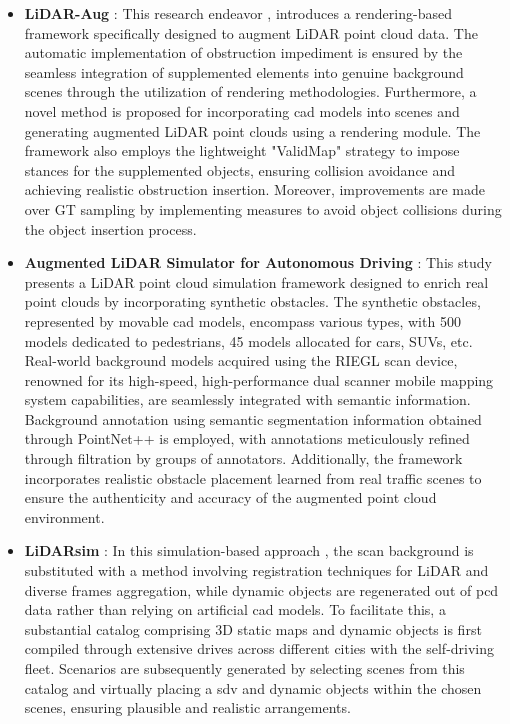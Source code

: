 \begin{itemize}
    \item \textbf{LiDAR-Aug} : This research endeavor \parencite{lidar_aug}, introduces a rendering-based framework specifically designed to augment LiDAR point cloud data. The automatic implementation of obstruction impediment is ensured by the seamless integration of supplemented elements into genuine background scenes through the utilization of rendering methodologies. Furthermore, a novel method is proposed for incorporating \acrfull{cad} models into scenes and generating augmented LiDAR point clouds using a rendering module. The framework also employs the lightweight "ValidMap" strategy to impose stances for the supplemented objects, ensuring collision avoidance and achieving realistic obstruction insertion. Moreover, improvements are made over GT sampling by implementing measures to avoid object collisions during the object insertion process.
    \item \textbf{Augmented LiDAR Simulator for Autonomous Driving} : This study \parencite{aug_lidar_sim_2020} presents a LiDAR point cloud simulation framework  designed to enrich real point clouds by incorporating synthetic obstacles. The synthetic obstacles, represented by movable \acrshort{cad} models, encompass various types, with 500 models dedicated to pedestrians, 45 models allocated for cars, SUVs, etc. Real-world background models acquired using the RIEGL scan device, renowned for its high-speed, high-performance dual scanner mobile mapping system capabilities, are seamlessly integrated with semantic information. Background annotation using semantic segmentation information obtained through PointNet++ \parencite{pointnetplus2017} is employed, with annotations meticulously refined through filtration by groups of annotators. Additionally, the framework incorporates realistic obstacle placement learned from real traffic scenes to ensure the authenticity and accuracy of the augmented point cloud environment.
    \item \textbf{LiDARsim} : In this simulation-based approach \parencite{lidarsim2020}, the scan background is substituted with a method involving registration techniques for LiDAR and diverse frames aggregation, while dynamic objects are regenerated out of \acrshort{pcd} data rather than relying on artificial \acrshort{cad} models. To facilitate this, a substantial catalog comprising 3D static maps and dynamic objects is first compiled through extensive drives across different cities with the self-driving fleet. Scenarios are subsequently generated by selecting scenes from this catalog and virtually placing a \acrfull{sdv} and dynamic objects within the chosen scenes, ensuring plausible and realistic arrangements.

\end{itemize}
